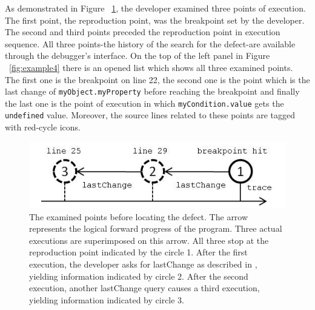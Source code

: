 \documentclass[preprint]{sigplanconf}
\begin{document}
As demonstrated in Figure ~\ref{fig:example-points}, the developer
examined three points of execution. The first point, the reproduction point,  was the breakpoint set by the developer.
The second and third points preceded the reproduction point in execution sequence.
All three points-the history
of the search for the defect-are available through the debugger's
interface. On the top of the left panel in Figure ~\ref{fig:example4}
there is an opened list which shows all three examined points. The
first one is the breakpoint on line 22, the second one is the point
which is the last change of \texttt{myObject.myProperty} before
reaching the breakpoint and finally the last one is the point of
execution in which \texttt{myCondition.value} gets the
\texttt{undefined} value. Moreover, the source lines related to these
points are tagged with red-cycle icons.

\begin{figure}[htp]
\includegraphics{5-example-points.jpg}
\caption{The examined points before locating the defect. The arrow represents the logical forward progress of the program. Three actual executions are superimposed on this arrow. All three stop at the reproduction point indicated by the circle 1. After the first execution, the developer asks for lastChange as described in , yielding information  indicated by circle 2. After the second execution, another lastChange query causes a third execution, yielding information indicated by circle 3.}
\label{fig:example-points}
\end{figure}
\end{document}
